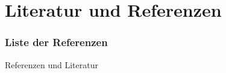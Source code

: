 \documentclass[aspectratio=169]{beamer}
\begin{document}
\part{Literatur und Referenzen}

\section{Liste der Referenzen}


\begin{frame}{Referenzen und Literatur}{ }

    \printbibliography

\end{frame}
\end{document}
